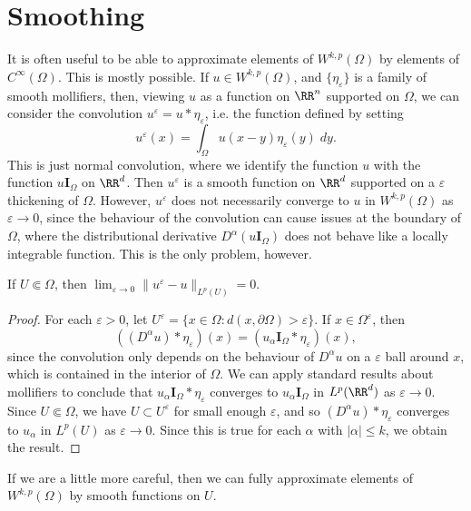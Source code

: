 \section{Smoothing}

It is often useful to be able to approximate elements of $W^{k,p}(\Omega)$ by elements of $C^\infty(\Omega)$. This is mostly possible. If $u \in W^{k,p}(\Omega)$, and $\{ \eta_\varepsilon \}$ is a family of smooth mollifiers, then, viewing $u$ as a function on $\RR^n$ supported on $\Omega$, we can consider the convolution $u^\varepsilon = u * \eta_\varepsilon$, i.e. the function defined by setting
%
\[ u^\varepsilon(x) = \int_\Omega u(x - y) \eta_\varepsilon(y)\; dy. \]
%
This is just normal convolution, where we identify the function $u$ with the function $u \mathbf{I}_\Omega$ on $\RR^d$. Then $u^\varepsilon$ is a smooth function on $\RR^d$ supported on a $\varepsilon$ thickening of $\Omega$. However, $u^\varepsilon$ does not necessarily converge to $u$ in $W^{k,p}(\Omega)$ as $\varepsilon \to 0$, since the behaviour of the convolution can cause issues at the boundary of $\Omega$, where the distributional derivative $D^\alpha(u \mathbf{I}_\Omega)$ does not behave like a locally integrable function. This is the only problem, however.

\begin{theorem}
  If $U \Subset \Omega$, then $\lim_{\varepsilon \to 0} \| u^\varepsilon - u \|_{L^p(U)} = 0$.
\end{theorem}
\begin{proof}
  For each $\varepsilon > 0$, let $U^\varepsilon = \{ x \in \Omega: d(x,\partial \Omega) > \varepsilon \}$. If $x \in \Omega^\varepsilon$, then
  \[ ((D^\alpha u) * \eta_\varepsilon)(x) = (u_\alpha \mathbf{I}_\Omega * \eta_\varepsilon)(x), \]
  since the convolution only depends on the behaviour of $D^\alpha u$ on a $\varepsilon$ ball around $x$, which is contained in the interior of $\Omega$. We can apply standard results about mollifiers to conclude that $u_\alpha \mathbf{I}_\Omega * \eta_\varepsilon$ converges to $u_\alpha \mathbf{I}_\Omega$ in $L^p(\RR^d)$ as $\varepsilon \to 0$. Since $U \Subset \Omega$, we have $U \subset U^\varepsilon$ for small enough $\varepsilon$, and so $(D^\alpha u) * \eta_\varepsilon$ converges to $u_\alpha$ in $L^p(U)$ as $\varepsilon \to 0$. Since this is true for each $\alpha$ with $|\alpha| \leq k$, we obtain the result.
\end{proof}

If we are a little more careful, then we can fully approximate elements of $W^{k,p}(\Omega)$ by smooth functions on $U$.

